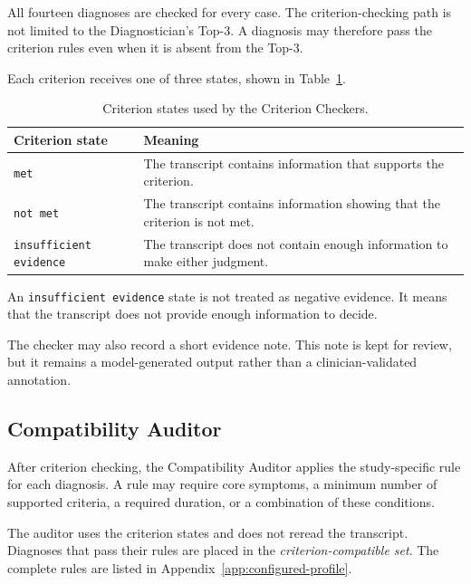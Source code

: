\documentclass[12pt,a4paper,oneside]{report}
\begin{document}
All fourteen diagnoses are checked for every case. The criterion-checking
path is not limited to the Diagnostician's Top-3. A diagnosis may
therefore pass the criterion rules even when it is absent from the
Top-3.

Each criterion receives one of three states, shown in
Table~\ref{tab:criterion-state-definitions}.

\begin{table}[htbp]
\centering
\caption{Criterion states used by the Criterion Checkers.}
\label{tab:criterion-state-definitions}
\small
\begin{tabularx}{\textwidth}
{|>{\raggedright\arraybackslash}p{3.6cm}|
 >{\raggedright\arraybackslash}X|}
\hline
\textbf{Criterion state} & \textbf{Meaning}\\
\hline
\texttt{met} &
The transcript contains information that supports the criterion.\\
\hline
\texttt{not met} &
The transcript contains information showing that the criterion is not
met.\\
\hline
\texttt{insufficient evidence} &
The transcript does not contain enough information to make either
judgment.\\
\hline
\end{tabularx}
\end{table}

An \texttt{insufficient evidence} state is not treated as negative
evidence. It means that the transcript does not provide enough
information to decide.

The checker may also record a short evidence note. This note is kept for
review, but it remains a model-generated output rather than a
clinician-validated annotation.

\subsection{Compatibility Auditor}
\label{sec:compatibility-auditor}

After criterion checking, the Compatibility Auditor applies the
study-specific rule for each diagnosis. A rule may require core symptoms,
a minimum number of supported criteria, a required duration, or a
combination of these conditions.

The auditor uses the criterion states and does not reread the transcript.
Diagnoses that pass their rules are placed in the
\emph{criterion-compatible set}. The complete rules are listed in
Appendix~\ref{app:configured-profile}.
\end{document}
